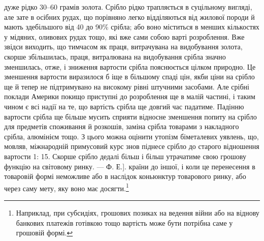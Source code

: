 дуже рідко 30--60 грамів золота. Срібло рідко трапляється в суцільному
вигляді, але зате в осібних рудах, що порівняно легко відділяються від жилової
породи й мають здебільшого від 40 до 90\% срібла; або воно міститься
в менших кількостях у мідяних, оливових рудах тощо, які вже сами собою
варті розроблення. Вже звідси виходить, що тимчасом як праця,
витрачувана на видобування золота, скорше збільшилась, праця, витралювана
на видобування срібла значно зменшилась, отже, і зниження
вартости срібла пояснюється цілком природно. Це зменшення вартости
виразилося б іще в більшому спаді цін, якби ціни на срібло ще й тепер
не підтримувано на високому рівні штучними засобами. Але срібні поклади
Америки покищо приступні до розроблення ще в малій частині, і таким
чином є всі надії на те, що вартість срібла ще довгий час падатиме. Падінню
вартости срібла ще більше мусить сприяти відносне зменшення попиту
на срібло для предметів споживання й розкошів, заміна срібла товарами
з накладного срібла, алюмінієм тощо. З цього можна оцінити утопізм
біметалевих уявлень, що, мовляв, міжнародній примусовий курс
знов піднесе срібло до старого відношення вартости 1: 15. Скорше
срібло дедалі більш і більш утрачатиме свою грошову функцію на світовому
ринку. — Ф. Е.].
країни до іншої, і коли це перенесення в товаровій формі неможливе
або в наслідок коньюнктур товарового ринку, або через
саму мету, яку воно має досягти.\footnote{
Наприклад, при субсидіях, грошових позиках на ведення війни
або на віднову банкових платежів готівкою тощо вартість може бути потрібна
саме у грошовій формі.
}

